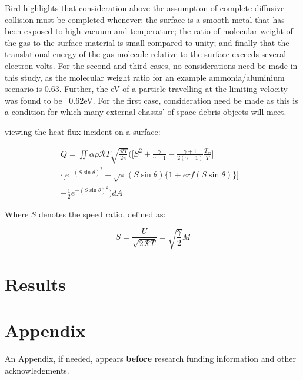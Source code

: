 \documentclass[journal]{new-aiaa}
\begin{document}
Bird highlights that consideration above the assumption of complete diffusive collision must be completed whenever: the surface is a smooth metal that has been exposed to high vacuum and temperature; the ratio of molecular weight of the gas to the surface material is small compared to unity; and finally that the translational energy of the gas molecule relative to the surface exceeds several electron volts. For the second and third cases, no considerations need be made in this study, as the molecular weight ratio for an example ammonia/aluminium scenario is 0.63. Further, the eV of a particle travelling at the limiting velocity was found to be ~0.62eV. For the first case, consideration need be made as this is a condition for which many external chassis' of space debris objects will meet.


viewing the heat flux incident on a surface:

\begin{equation}
    \begin{aligned}
    Q = \iint  \alpha \rho \mathcal{R} T \sqrt{\frac{\mathcal{R} T}{2 \pi}} \bigg( \bigg[ S^2 + \frac{\gamma}{\gamma - 1} - \frac{\gamma + 1 }{2( \gamma -1)} \frac{T_w}{T} \bigg] &\\ 
     \cdot \bigg[ e^{-(S \sin{\theta})^2} + \sqrt{\pi} ( S \sin{\theta} ) \{1 + erf ( S \sin{\theta}) \}  \bigg] &\\
     - \frac{1}{2} e^{-(S \sin{\theta})^2} \bigg) dA &
    \end{aligned}
\end{equation}

Where $S$ denotes the speed ratio, defined as:

\begin{equation}
    S = \frac{U}{\sqrt{2 \mathcal{R} T}} = \sqrt{\frac{\gamma}{2}} M
\end{equation}





  

\newpage
\section{Results}
\label{sec-results}



\newpage
\section*{Appendix}

An Appendix, if needed, appears \textbf{before} research funding information and other acknowledgments.
\end{document}
